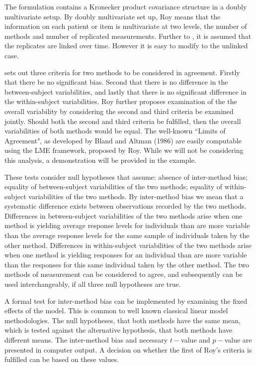 \documentclass[12pt, a4paper]{report}
\theoremstyle{plain}
\theoremstyle{definition}
\theoremstyle{remark}
\begin{document}
The formulation contains a Kronecker product covariance structure in a doubly multivariate setup. By doubly multivariate set up, Roy means that the information on each patient or item is multivariate at two levels, the number of methods and number of replicated measurements. Further to \citet{lam}, it is assumed that the replicates are linked over time. However it is easy to modify to the unlinked case.

\citet{ARoy2009} sets out three criteria for two methods to be considered in agreement. Firstly that there be no significant bias. Second that there is no difference in the between-subject variabilities, and lastly that there is no significant difference in the within-subject variabilities. Roy further proposes examination of the the overall variability by considering the second and third criteria be examined jointly. Should both the second and third criteria be fulfilled, then the overall variabilities of both methods would be equal.
The well-known ``Limits of Agreement", as developed by Bland and Altman (1986) are easily computable using the LME framework, proposed by Roy. While we will not be considering this analysis, a demonstration will be provided in the example.

These tests consider null hypotheses that assume: absence of inter-method bias; equality of between-subject variabilities of the two methods; equality of within-subject variabilities of the two methods. By inter-method bias we mean that a systematic difference exists between observations recorded by the two methods. Differences in between-subject variabilities of the two methods arise when one method is yielding average response levels for individuals than are more variable than the average response levels for the same sample of individuals taken by the other method.  Differences in within-subject variabilities of the two methods arise when one method is yielding responses for an individual than are more variable than the responses for this same individual taken by the other method. The two methods of measurement can be considered to agree, and subsequently can be used interchangeably, if all three null hypotheses are true.

A formal test for inter-method bias can be implemented by examining the fixed effects of the model. This is common to well known classical linear model methodologies. The null hypotheses, that both methods have the same mean, which is tested against the alternative hypothesis, that both methods have different means.
The inter-method bias and necessary $t-$value and $p-$value are presented in computer output. A decision on whether the first of Roy's criteria is fulfilled can be based on these values.
\end{document}
